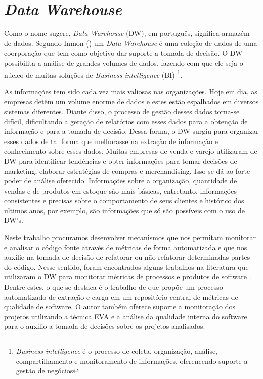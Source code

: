 \chapter{\emph{Data Warehouse}}
\label{Att:dw}


Como o nome sugere, \emph{Data Warehouse} (DW), em português, significa armazém de dados. Segundo Inmon (\citeyear{inmon2002}) um \emph{Data Warehouse} é uma coleção de dados de uma coorporação que tem como objetivo dar suporte a tomada de decisão. 
%
O DW possibilita a análise de grandes volumes de dados, fazendo com que ele seja o núcleo de muitas soluções de \emph{Business intelligence} (BI)
%
\footnote{\emph{Business intelligence} é o processo de coleta, organização, análise, compartilhamento e monitoramento de informações, oferencendo suporte a gestão de negócios}. 
%

As informações tem sido cada vez mais valiosas nas organizações. Hoje em dia, as empresas detêm um volume enorme de dados e estes estão espalhados em diversos sistemas diferentes. Diante disso, o processo de gestão desses dados torna-se difícil, dificultando a geração de relatórios com esses dados para a obtenção de informação e para a tomada de decisão. Dessa forma, o DW surgiu para organizar esses dados de tal forma que melhorasse na extração de informação e conhecimento sobre esses dados. Muitas empresas de venda e varejo utilizaram de DW para identificar tendências e obter informações para tomar decisões de marketing, elaborar estratégias de compras e merchandising. Isso se dá ao forte poder de análise oferecido. Informações sobre a organização, quantidade de vendas e de produtos em estoque são mais básicas, entretanto, informações consistentes e precisas sobre o comportamento de seus clientes e histórico dos ultimos anos, por exemplo, são informações que só são possíveis com o uso de DW's.

%
Neste trabalho procuramos desenvolver mecanismos que nos permitam monitorar e analisar o código fonte através de métricas de forma automatizada e que nos auxilie na tomada de decisão de refatorar ou não refatorar determinadas partes do código. 
%
Nesse sentido, foram encontrados alguns trabalhos na literatura que utilizaram o DW para monitorar métricas de processos e produtos de software \cite{Folleco2007} \cite{Silveira2010}\cite{mazuco2011}. Dentre estes, o que se destaca é o trabalho de  \cite{Silveira2010} que propõe um processo automatizado de extração e carga em um repositório central de métricas de qualidade de software. O autor também oferece suporte a monitoração dos projetos utilizando a técnica EVA e a análise da qualidade interna do software para o auxilio a tomada de decisões sobre os projetos analisados.

